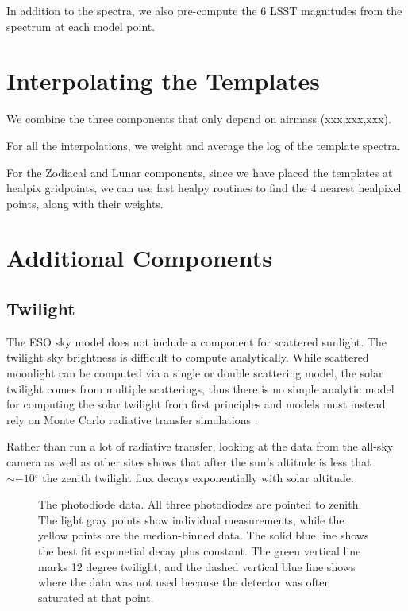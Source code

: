 \documentclass{emulateapj}  %
\newcommand\degree{{^\circ}}
\begin{document}
In addition to the spectra, we also pre-compute the 6 LSST magnitudes from the spectrum at each model point.

\section{Interpolating the Templates}

We combine the three components that only depend on airmass (xxx,xxx,xxx).

For all the interpolations, we weight and average the log of the template spectra.

For the Zodiacal and Lunar components, since we have placed the templates at healpix gridpoints, we can use fast healpy routines to find the 4 nearest healpixel points, along with their weights.  


\section{Additional Components}

\subsection{Twilight}

The ESO sky model does not include a component for scattered sunlight.  The twilight sky brightness is difficult to compute analytically.  While scattered moonlight can be computed via a single or double scattering model, the solar twilight comes from multiple scatterings, thus there is no simple analytic model for computing the solar twilight from first principles and models must instead rely on Monte Carlo radiative transfer simulations \citep{Patat06}.

Rather than run a lot of radiative transfer, looking at the data from the all-sky camera as well as other sites shows that after the sun's altitude is less that $\sim-10\degree$ the zenith twilight flux decays exponentially with solar altitude.

\begin{figure*}
  \caption{The photodiode data.  All three photodiodes are pointed to zenith. The light gray points show individual measurements, while the yellow points are the median-binned data. The solid blue line shows the best fit exponetial decay plus constant. The green vertical line marks 12 degree twilight, and the dashed vertical blue line shows where the data was not used because the detector was often saturated at that point. \label{diodePlot}}
\end{figure*}
\end{document}

